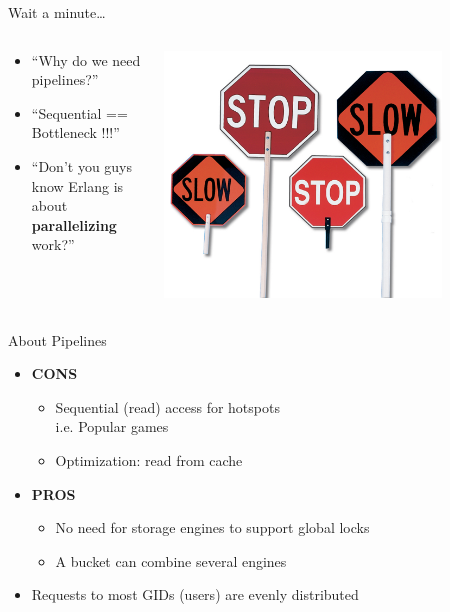 \documentclass[aspectratio=169]{beamer}
\begin{document}
\begin{frame}{Wait a minute\dots}
    \begin{columns}
        \begin{column}[c]{0.5\textwidth}
            \begin{itemize}
                \item ``Why do we need pipelines?''
                \item ``Sequential == Bottleneck !!!''
                \item ``Don't you guys know Erlang is about \textbf{parallelizing} work?''
            \end{itemize}
        \end{column}
        \begin{column}[c]{0.5\textwidth}
            \includegraphics[width=0.8\textwidth]{images/slow.png}
        \end{column}
    \end{columns}
\end{frame}

\begin{frame}{About Pipelines}
    \begin{itemize}
        \item \textbf{CONS}
            \begin{itemize}
                \item Sequential (read) access for hotspots\\
                    i.e. Popular games
                \item Optimization: read from cache
            \end{itemize}
        \pause
        \item \textbf{PROS}
            \begin{itemize}
                \item No need for storage engines to support global locks
                \item A bucket can combine several engines
            \end{itemize}
        \pause
        \item Requests to most GIDs (users) are evenly distributed
    \end{itemize}
\end{frame}
\end{document}
